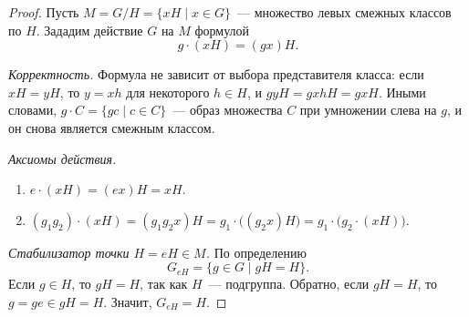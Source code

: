 \documentclass[12pt]{article}
\begin{document}
	\begin{proof}
		Пусть $M=G/H=\{xH\mid x\in G\}$~--- множество левых смежных классов
		по $H$. Зададим действие $G$ на $M$ формулой
		\[
			g\cdot(xH)=(gx)H.
		\]

		\emph{Корректность.} Формула не зависит от выбора представителя
		класса: если $xH=yH$, то $y=xh$ для некоторого $h\in H$, и
		$gyH=gxhH=gxH$. Иными словами, $g\cdot C=\{gc\mid c\in C\}$~---
		образ множества $C$ при умножении слева на $g$, и он снова является
		смежным классом.

		\emph{Аксиомы действия.}
		\begin{enumerate}
			\item $e\cdot(xH)=(ex)H=xH$.
			\item $(g_1g_2)\cdot(xH)=(g_1g_2x)H=g_1\cdot\bigl((g_2x)H\bigr)
				=g_1\cdot\bigl(g_2\cdot(xH)\bigr)$.
		\end{enumerate}

		\emph{Стабилизатор точки $H=eH\in M$.} По определению
		\[
			G_{eH}=\{g\in G\mid gH=H\}.
		\]
		Если $g\in H$, то $gH=H$, так как $H$~--- подгруппа. Обратно, если
		$gH=H$, то $g=ge\in gH=H$. Значит, $G_{eH}=H$.
	\end{proof}





\end{document}
